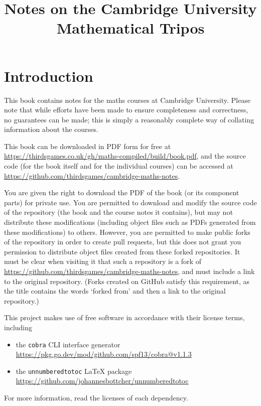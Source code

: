 \documentclass{book}
\title{Notes on the Cambridge University Mathematical Tripos}
\author{}
\begin{document}
\maketitle

\dominitoc{}

\setcounter{tocdepth}{0}
\tableofcontents
\newpage
\setcounter{tocdepth}{3}

\chapter*{Introduction}
This book contains notes for the maths courses at Cambridge University.
Please note that while efforts have been made to ensure completeness and correctness, no guarantees can be made; this is simply a reasonably complete way of collating information about the courses.

This book can be downloaded in PDF form for free at \url{https://thirdsgames.co.uk/gh/maths-compiled/build/book.pdf}, and the source code (for the book itself and for the individual courses) can be accessed at \url{https://github.com/thirdsgames/cambridge-maths-notes}.

You are given the right to download the PDF of the book (or its component parts) for private use.
You are permitted to download and modify the source code of the repository (the book and the course notes it contains), but may not distribute these modifications (including object files such as PDFs generated from these modifications) to others.
However, you are permitted to make public forks of the repository in order to create pull requests, but this does not grant you permission to distribute object files created from these forked repositories.
It must be clear when visiting it that such a repository is a fork of \url{https://github.com/thirdsgames/cambridge-maths-notes}, and must include a link to the original repository.
(Forks created on GitHub satisfy this requirement, as the title contains the words `forked from' and then a link to the original repository.)

This project makes use of free software in accordance with their license terms, including
\begin{itemize}
	\item the \texttt{cobra} CLI interface generator \\ \url{https://pkg.go.dev/mod/github.com/spf13/cobra@v1.1.3}
	\item the \texttt{unnumberedtotoc} LaTeX package \\ \url{https://github.com/johannesbottcher/unnumberedtotoc}
\end{itemize}
For more information, read the licenses of each dependency.
\end{document}
